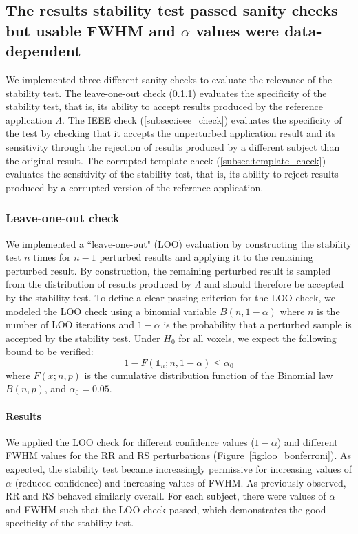 \documentclass[lettersize,journal]{IEEEtran}
\begin{document}
{\subsection{The results stability test passed sanity checks but usable FWHM and \texorpdfstring{$\alpha$}{α} values were data-dependent}

We implemented three different sanity checks to evaluate the relevance of the stability test.
The leave-one-out check (\ref{subsec:loo_check}) evaluates the specificity of the stability test, that is, its ability to accept results produced by the reference application $\Lambda$.
The IEEE check (\ref{subsec:ieee_check}) evaluates the specificity of the test by checking that it accepts the unperturbed application result and its sensitivity through the rejection of results produced by a different subject than the original result.
The corrupted template check (\ref{subsec:template_check}) evaluates the sensitivity of the stability test, that is, its ability to reject results produced by a corrupted version of the reference application.

\subsubsection{Leave-one-out check}
\label{subsec:loo_check}
We implemented a ``leave-one-out" (LOO) evaluation by constructing the stability test $n$ times for $n-1$ perturbed results and applying it to the remaining perturbed result. By construction, the remaining perturbed result is sampled from the distribution of results produced by $\Lambda$ and should therefore be accepted by the stability test.
To define a clear passing criterion for the LOO check, we modeled the LOO check using a binomial variable $B(n,1-\alpha)$ where $n$ is the number of LOO iterations and $1-\alpha$ is the probability that a perturbed sample is accepted by the stability test. Under $H_0$ for all voxels, we expect the following bound to be verified:
\[
  1-F(\mathds{1}_n;n,1-\alpha) \leq \alpha_0
\]
where $F(x;n,p)$ is the cumulative distribution function of the Binomial law $B(n,p)$, and $\alpha_0=0.05$.

\paragraph*{Results} We applied the LOO check for different confidence values ($1-\alpha$) and different FWHM  values for the RR and RS perturbations (Figure~\ref{fig:loo_bonferroni}). As expected, the stability test became increasingly permissive for increasing values of $\alpha$ (reduced confidence) and increasing values of FWHM. As previously observed, RR and RS behaved similarly overall. For each subject, there were values of $\alpha$ and FWHM such that the LOO check passed, which demonstrates the good specificity of the stability test.

}
\end{document}
